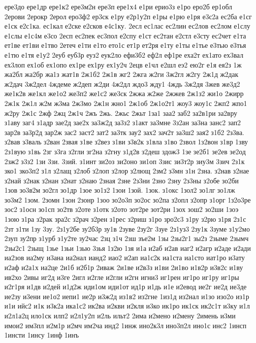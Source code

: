 {ере3до
ере1др
ере1к2
ере3м2н
ере3п
ере1х4
е1ри
ерио3з
е1ро
еро2б
ер1обл
2ерови
2ерокр
2ерол
еро3ф2
ер3ск
е1ру
е2р1у2п
е1ры
е1рю
е1ря
е3с2а
ес2ба
е1сг
е1ск
е2с1ка.
ес1кал
е2ске
е2сков
е4с1ку.
2есл
ес1лас
ес2лин
ес2лов
ес2лом
е1слу
е1слы
е1с4м
е3со
2есп
ес2пек
ес3пол
е2спу
е1ст
ес2тан
е2стл
е3сту
ес2чет
е1та
ет1ве
ет1ви
е1тво
2етеч
е1ти
е1то
ето1с
ет1р
ет2ря
е1ту
е1ты
е1тье
е3тью
е3тья
е1тю
е1тя
е1у2
2еуб
еуб3р
еуз2
еук2ло
ефи3б2
еф2л
еф1ре
еха2т
ех1ато
ех3вал
ех3лоп
ех1об
ех1опо
ех1ре
ех1ру
ех1у2ч
2ецв
е1чл
е2шл
еэ2
ею2г
е1я
ея2з
1ж
жа2бл
жа2бр
жа1з
жат1в
2ж1б2
2ж1в
жг2
2жга
ж2ги
3ж2гл
ж2гу
2ж1д
ж2дак
ж2дач
3ж2дел
4ждеме
ж2деп
ж2ди
4ж2дл
ждо3
жду1
4ждь
3ж2дя
3жев
же3д2
же1к2в
же1кл
же1о2
же3п2
же1с2
же3ск
2жжа
ж2же
2жжев
2ж1з2
жи1о
2жирр
2ж1к
2ж1л
ж2м
ж3ма
2ж3мо
2ж1н
жно1
2ж1об
2ж1о2т1
жоу3
жоу1с
2жп2
жпо1
ж2ру
2ж1с
2жф
2жц
2ж1ч
2жъ
2жь.
2жьс
2жьт
1за1
заа2
заб2
за2в1ри
за2вру
з1аву
заг4
з1адр
зае2д
зае2х
за3ж2д
за3з2
з1акт
за3мне
3з2ан
за3на
занс2
зап2
зар2в
за3р2д
зар2ж
зас2
заст2
зат2
за3тк
зау2
зах2
зач2т
за3ш2
зая2
з1б2
2з3ва.
з2вав
з3валь
з2ван
2звая
з1ве
з2вез
з1ви
з3в2к
з1вла
з1во
2звол
1з2вон
з1вр
1зву
2з1вую
з1вь
2зг
з3га
з2гли
зг2на
з2гну
з1д2в
з2деш
здож3
1зе
зе2б1
зе2ев
зе2од
2зж2
з3з2
1зи
3зи.
3зий.
з1инт
зи2оз
зи2оно
зи1оп
3зис
зи3т2р
зиу3м
3зич
2з1к
зко1
зко3п2
з1л
з2лащ
з2лоб
з2лоп
з2лор
з2лющ
2зм2
з3мн
з1н
2зна.
з2нав
з2нае
з2най
з2нак
з2нан
з2нат
з2наю
2зная
2зне
2з3ни
2зно
2зну
2з3ны
з2обе
зо2би
1зов
зо3в2м
зо2гл
зо1др
1зое
зо1з2
1зои
1зой.
1зок.
з1окс
1зол2
зо1лг
зо1лж
зо3м2
1зом.
2зомн
1зон
2зонр
1зоо
зо2о3п
зо2ос
зо2па
з2опл
з2опр
з1орг
1з2о3ре
зос2
з1осн
зо1сп
зо2тв
з2оте
з1отк
з2ото
зот2ре
зот2ри
1зох
зош2
зо2ши
1зоэ
1зою
з1ра
з2рак
зра2с
з2рач
з2рен
з1рес
з2риш
з1ро
зро2с3
з1ру
з2рю
з1ря
2з1с
2зт
з1ти
1зу
3зу.
2з1у2бе
зу2б3р
зу1в
2зуве
2зу2г
3зуе
2з1уз3
2зу1к
3зуме
з1у2мо
2зуп
зу2пр
з1урб
з1у2те
зу2час
2зц
з1ч
2зш
зъе2м
1зы
2зы2г1
зы2з
2зыме
2зымч
2зы2с1
2зыщ
1зье
1зьи
1зью
3зья
1з2ю
1зя
и1а
и2аб
и2ав
иаг2
и2агр
и2аде
и2ади
иа2зов
иа2му
и3ана
иа2нал
ианд2
иао2
и2ап
иа1с2к
иа1ста
иа1сто
иат1ро
и3ату
и2аф
и2а1х
иа2це
2и1б
и2б1р
2иваж
2и1ве
и2в3з
и1ви
2и1во
и1в2р
и3в2с
и1ву
ив2хо
2ивы
иг2д
и3ге
2игл
и2гле
и2гли
и2гн
игни3
иг1рен
иг1ро
иг1ру
иг1ры
и2г1ря
и1дв
и2дей
и1д2ж
иди1ом
иди1от
ид1р
и1дь
и1е
и2евод
ие2г
ие2д
ие3де
ие2зу
и3ени
ие1о2
иепи1
ие2р
и3ж2д
из1в2
из2гне
1из1д
из2нал
и1зо
изо2о
из1р
и1и
ийс2
и1к
и3к2а
ика1с2
ик2ва
и2кви
и2кля
и3ко
ик1ро
ик1ск
ик2с1т
и3ку
и1л
и2л1а2ц
ило1ск
илп2
и2л1у2п
и2ль
ильт2
2има
и2мено
и2мену
2имень
и3ми
имои2
им3пл
и2м1р
и2мч
им2ча
инд2
1инж
ино2к3л
ино3п2л
ино1с
инс2
1инсп
1инсти
1инсу
1инф
1инъ
}
